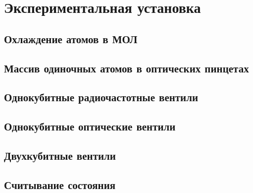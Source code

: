 \section{Экспериментальная установка}
\label{sec:Experiment}

\subsection{Охлаждение атомов в МОЛ}

\subsection{Массив одиночных атомов в оптических пинцетах}

\subsection{Однокубитные радиочастотные вентили}

\subsection{Однокубитные оптические вентили}

\subsection{Двухкубитные вентили}

\subsection{Считывание состояния}

\newpage